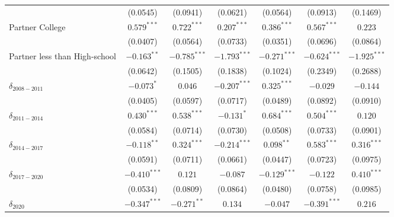 \begin{tabular}{l|ccc|ccc}
                              &        (0.0545) &        (0.0941) &        (0.0621) &             (0.0564) &        (0.0913) &        (0.1469) \\
Partner College               &   $0.579^{***}$ &   $0.722^{***}$ &   $0.207^{***}$ &        $0.386^{***}$ &   $0.567^{***}$ &         $0.223$ \\
                              &        (0.0407) &        (0.0564) &        (0.0733) &             (0.0351) &        (0.0696) &        (0.0864) \\
Partner less than High-school &   $-0.163^{**}$ &  $-0.785^{***}$ &  $-1.793^{***}$ &       $-0.271^{***}$ &  $-0.624^{***}$ &  $-1.925^{***}$ \\
                              &        (0.0642) &        (0.1505) &        (0.1838) &             (0.1024) &        (0.2349) &        (0.2688) \\
$\delta_{2008-2011}$          &      $-0.073^*$ &         $0.046$ &  $-0.207^{***}$ &        $0.325^{***}$ &        $-0.029$ &        $-0.144$ \\
                              &        (0.0405) &        (0.0597) &        (0.0717) &             (0.0489) &        (0.0892) &        (0.0910) \\
$\delta_{2011-2014}$          &   $0.430^{***}$ &   $0.538^{***}$ &      $-0.131^*$ &        $0.684^{***}$ &   $0.504^{***}$ &         $0.120$ \\
                              &        (0.0584) &        (0.0714) &        (0.0730) &             (0.0508) &        (0.0733) &        (0.0901) \\
$\delta_{2014-2017}$          &   $-0.118^{**}$ &   $0.324^{***}$ &  $-0.214^{***}$ &         $0.098^{**}$ &   $0.583^{***}$ &   $0.316^{***}$ \\
                              &        (0.0591) &        (0.0711) &        (0.0661) &             (0.0447) &        (0.0723) &        (0.0975) \\
$\delta_{2017-2020}$          &  $-0.410^{***}$ &         $0.121$ &        $-0.087$ &       $-0.129^{***}$ &        $-0.122$ &   $0.410^{***}$ \\
                              &        (0.0534) &        (0.0809) &        (0.0864) &             (0.0480) &        (0.0758) &        (0.0985) \\
$\delta_{2020}$               &  $-0.347^{***}$ &   $-0.271^{**}$ &         $0.134$ &             $-0.047$ &  $-0.391^{***}$ &         $0.216$ \\

\end{tabular}
